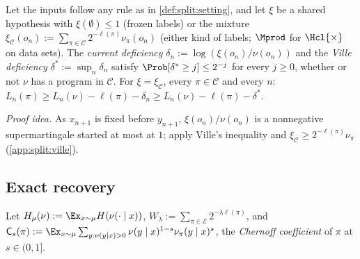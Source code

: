 \begin{lemma}\label{lem:split:ville}
Let the inputs follow any rule as in \cref{def:split:setting}, and let $\xi$ be a shared hypothesis with $\xi(\emptyset)\le1$ (frozen labels) or the mixture $\xi_{\mathcal C}(o_n):=\sum_{\pi\in\mathcal C}2^{-\ell(\pi)}\nu_\pi(o_n)$ (either kind of labels; $\Mprod$ for $\Hcl{\times}$ on data sets). The \emph{current deficiency} $\delta_n:=\log(\xi(o_n)/\nu(o_n))$ and the \emph{Ville deficiency} $\delta^*:=\sup_n\delta_n$ satisfy $\Prob[\delta^*\ge j]\le2^{-j}$ for every $j\ge0$, whether or not $\nu$ has a program in $\mathcal C$. For $\xi=\xi_{\mathcal C}$, every $\pi\in\mathcal C$ and every $n$: $L_n(\pi)\ge L_n(\nu)-\ell(\pi)-\delta_n\ge L_n(\nu)-\ell(\pi)-\delta^*$.
\end{lemma}

\emph{Proof idea.} As $x_{n+1}$ is fixed before $y_{n+1}$, $\xi(o_n)/\nu(o_n)$ is a nonnegative supermartingale started at most at $1$; apply Ville's inequality \citep{ville1939etude} and $\xi_{\mathcal C}\ge2^{-\ell(\pi)}\nu_\pi$ (\cref{app:split:ville}).

\subsection{Exact recovery}\label{sec:recovery:main}

Let $H_\mu(\nu):=\Ex_{x\sim\mu}H(\nu(\cdot\mid x))$, $W_\lambda:=\sum_{\pi\in\mathcal E}2^{-\lambda\ell(\pi)}$, and $\mathsf C_s(\pi):=\Ex_{x\sim\mu}\sum_{y:\nu(y\mid x)>0}\nu(y\mid x)^{1-s}\nu_\pi(y\mid x)^s$, the \emph{Chernoff coefficient} of $\pi$ at $s\in(0,1]$.

